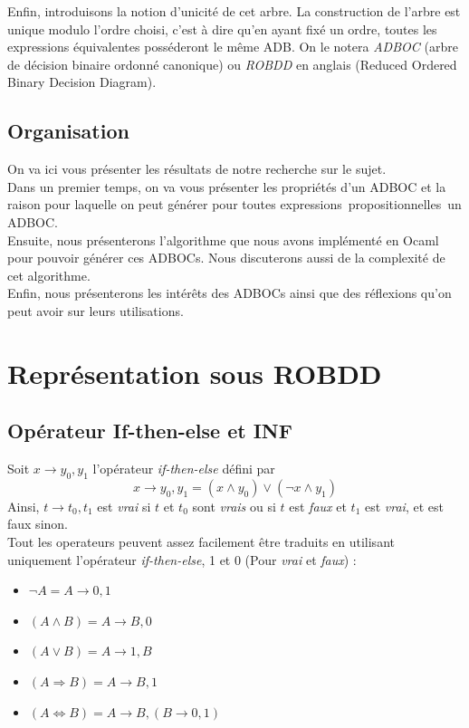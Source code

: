 \documentclass[a4paper, oneside]{report}
\newcommand{\expps}{expressions~propositionnelles~}
\begin{document}
Enfin, introduisons la notion d'unicité de cet arbre. La construction de l'arbre est unique modulo l'ordre choisi, c'est à dire qu'en ayant fixé un ordre, toutes les expressions équivalentes posséderont le même ADB. On le notera \textit{ADBOC} (arbre de décision binaire ordonné canonique) ou \textit{ROBDD} en anglais (Reduced Ordered Binary Decision Diagram).\\
 
\section*{Organisation}
On va ici vous présenter les résultats de notre recherche sur le sujet.\\
Dans un premier temps, on va vous présenter les propriétés d'un ADBOC et la raison pour laquelle on peut générer pour toutes \expps un ADBOC.\\
Ensuite, nous présenterons l'algorithme que nous avons implémenté en Ocaml pour pouvoir générer ces ADBOCs. Nous discuterons aussi de la complexité de cet algorithme.\\
Enfin, nous présenterons les intérêts des ADBOCs ainsi que des réflexions qu'on peut avoir sur leurs utilisations.  



\chapter{Représentation sous ROBDD}

\section{Opérateur If-then-else et INF}

Soit $ x \rightarrow y_0, y_1 $ l'opérateur \textit{if-then-else} défini par \\
$$ x \rightarrow y_0, y_1 = ( x \wedge y_0 ) \vee ( \neg x \wedge y_1 )$$
Ainsi, $ t \rightarrow t_0, t_1 $ est \textit{vrai} si $t$ et $t_0$ sont \textit{vrais} ou si $t$ est \textit{faux} et $t_1$ est \textit{vrai}, et est faux sinon.\\
Tout les operateurs peuvent assez facilement être traduits en utilisant uniquement l'opérateur \textit{if-then-else}, 1 et 0 (Pour \textit{vrai} et \textit{faux}) :\\

\begin{itemize}
\item $ \neg A = A \rightarrow 0, 1$
\item $ (A \wedge B) = A \rightarrow B, 0$
\item $ (A \vee B) = A \rightarrow 1, B$
\item $ (A \Rightarrow B) = A \rightarrow B, 1$
\item $ (A \Leftrightarrow B) = A \rightarrow B, (B \rightarrow 0, 1)$
\end{itemize}
\end{document}
